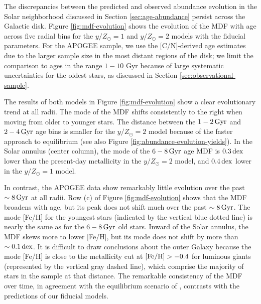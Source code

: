 \documentclass[twocolumn,twocolappendix,linenumbers]{aastex631}
\newcommand{\mathFeH}{{\rm [Fe/H]}}
\newcommand{\yZ}[1]{$y/Z_\odot=#1$}
\newcommand{\Gyr}{\,{\rm Gyr}}
\newcommand{\dex}{\,{\rm dex}}
\begin{document}
The discrepancies between the predicted and observed abundance evolution in the Solar neighborhood discussed in Section \ref{sec:age-abundance} persist across the Galactic disk. Figure \ref{fig:mdf-evolution} shows the evolution of the MDF with age across five radial bins for the \yZ{1} and \yZ{2} models with the fiducial parameters. 
For the APOGEE sample, we use the [C/N]-derived age estimates due to the larger sample size in the most distant regions of the disk; we limit the comparison to ages in the range $1-10$ Gyr because of large systematic uncertainties for the oldest stars, as discussed in Section \ref{sec:observational-sample}. 

The results of both models in Figure \ref{fig:mdf-evolution} show a clear evolutionary trend at all radii. The mode of the MDF shifts consistently to the right when moving from older to younger stars. The distance between the $1-2\Gyr$ and $2-4\Gyr$ age bins is smaller for the \yZ{2} model because of the faster approach to equilibrium (see also Figure \ref{fig:abundance-evolution-yields}). In the Solar annulus (center column), the mode of the $6-8\Gyr$ age MDF is $0.3\dex$ lower than the present-day metallicity in the \yZ{2} model, and $0.4\dex$ lower in the \yZ{1} model.

In contrast, the APOGEE data show remarkably little evolution over the past $\sim8\Gyr$ at all radii. Row (c) of Figure \ref{fig:mdf-evolution} shows that the MDF broadens with age, but its peak does not shift much over the past $\sim8\Gyr$. The mode [Fe/H] for the youngest stars (indicated by the vertical blue dotted line) is nearly the same as for the $6-8\Gyr$ old stars. Inward of the Solar annulus, the MDF skews more to lower [Fe/H], but its mode does not shift by more than $\sim0.1\dex$. It is difficult to draw conclusions about the outer Galaxy because the mode [Fe/H] is close to the metallicity cut at $\mathFeH>-0.4$ for luminous giants (represented by the vertical gray dashed line), which comprise the majority of stars in the sample at that distance. The remarkable consistency of the MDF over time, in agreement with the equilibrium scenario of \citet{johnson_milky_2024}, contrasts with the predictions of our fiducial models.
\end{document}
